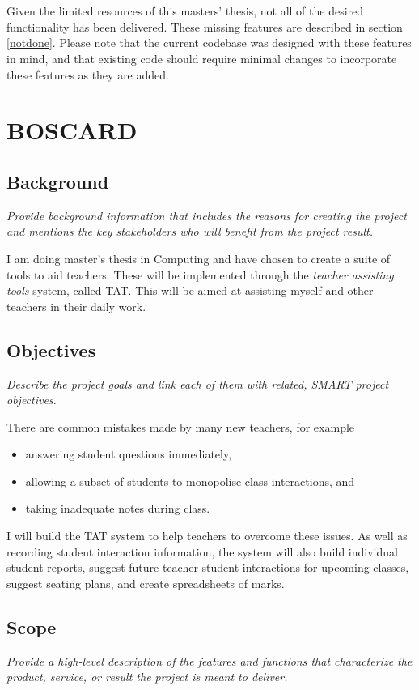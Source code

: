 \documentclass[10pt]{article}
\begin{document}
\



\

Given the limited resources of this masters' thesis, not all of the desired functionality has been delivered. These missing features are described in section \ref{notdone}. Please note that the current codebase was designed with these features in mind, and that existing code should require minimal changes to incorporate these features as they are added.

\section{BOSCARD}


\subsection{Background}
\emph{Provide background information that includes the reasons for creating the project and mentions the key stakeholders who will benefit from the project result.}

I am doing master's thesis in Computing and have chosen to create a suite of tools to aid teachers. These will be implemented through the \emph{teacher assisting tools} system, called TAT. This will be aimed at assisting  myself and other teachers in their daily work.

\subsection{Objectives} 
\emph{Describe the project goals and link each of them with related, SMART project objectives.}


There are common mistakes made by many new teachers, for example 
\begin{itemize}
\item answering student questions immediately,
\item allowing a subset of students to monopolise class interactions, and
\item taking inadequate notes during class.
\end{itemize}
I will build the TAT system to help teachers to overcome these issues. As well as recording student interaction information, the system will also build individual student reports, suggest future teacher-student interactions for upcoming classes, suggest seating plans, and create spreadsheets of marks.

\subsection{Scope} 
\emph{Provide a high-level description of the features and functions that characterize the product, service, or result the project is meant to deliver.}
\end{document}

